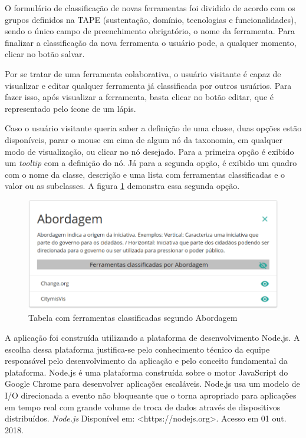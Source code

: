 \par
O formulário de classificação de novas ferramentas foi dividido de acordo com os grupos definidos na TAPE (sustentação, domínio, tecnologias e funcionalidades), sendo o único campo de preenchimento obrigatório, o nome da ferramenta. Para finalizar a classificação da nova ferramenta o usuário pode, a qualquer momento, clicar no botão salvar. 
\par
Por se tratar de uma ferramenta colaborativa, o usuário visitante é capaz de visualizar e editar qualquer ferramenta já classificada por outros usuários. 
Para fazer isso, após visualizar a ferramenta, basta clicar no botão editar, que é representado pelo ícone de um lápis. 

\par
Caso o usuário visitante queria saber a definição de uma classe, duas opções estão disponíveis, parar o mouse em cima de algum nó da taxonomia, em qualquer modo de visualização, 
ou clicar no nó desejado. Para a primeira opção é exibido um \textit{tooltip} com a definição do nó. Já para a segunda opção, é exibido um quadro com o nome da classe, descrição e 
uma lista com ferramentas classificadas e o valor ou as subclasses. A figura \ref{fig:tabela-ferramentas} demonstra essa segunda opção. 

\begin{figure}[!ht]
    \centering
    \includegraphics[scale=0.20]{./figuras/abordagem.png}
    \caption{Tabela com ferramentas classificadas segundo Abordagem}
    \label{fig:tabela-ferramentas}
\end{figure}
\par

A aplicação foi construída utilizando a plataforma de desenvolvimento Node.js. A escolha dessa plataforma justifica-se pelo conhecimento técnico da equipe responsável pelo desenvolvimento da aplicação e pelo conceito fundamental da plataforma. Node.js é uma plataforma construída sobre o motor JavaScript do Google Chrome para desenvolver aplicações escaláveis. Node.js usa um modelo de I/O direcionada a evento não bloqueante que o torna
apropriado para aplicações em tempo real com grande volume de troca de dados através de dispositivos distribuídos. 
\textit{Node.js} Disponível em: <https://nodejs.org>. Acesso em 01 out. 2018.

